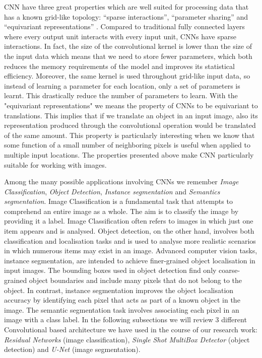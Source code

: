 CNN have three great properties which are well suited for processing data that has a known grid-like topology: “sparse interactions”, “parameter sharing” and “equivariant representations” \citep{goodfellow2016deep}. Compared to traditional fully connected layers where every output unit interacts with every input unit, CNNs have sparse interactions. In fact, the size of the convolutional kernel is lower than the size of the input data which means that we need to store fewer parameters, which both reduces the memory requirements of the model and improves its statistical efficiency. Moreover, the same kernel is used throughout grid-like input data, so instead of learning a parameter for each location, only a set of parameters is
learnt. This drastically reduce the number of parameters to learn. With the "equivariant representations" we means the property of CNNs to be equivariant to translations. This implies that if we translate an object in an input image, also its representation produced through the convolutional operation would be translated of the same amount. This property is particularly interesting when we know that some function of a small number of neighboring pixels is useful when applied to multiple input locations. The properties presented above make CNN particularly suitable for working with images. 

Among the many possible applications involving CNNs we remember \textit{Image Classification}, \textit{Object Detection}, \textit{Instance segmentation} and \textit{Semantics segmentation}. Image Classification is a fundamental task that attempts to comprehend an entire image as a whole. The aim is to classify the image by providing it a label. Image Classification often refers to images in which just one item appears and is analysed. Object detection, on the other hand, involves both classification and localisation tasks and is used to analyse more realistic scenarios in which numerous items may exist in an image. Advanced computer vision tasks, instance segmentation, are intended to achieve finer-grained object localisation in input images. The bounding boxes used in object detection find only coarse-grained object boundaries and include many pixels that do not belong to the object. In contrast, instance segmentation improves the object localisation accuracy by identifying each pixel that acts as part of a known object in the image. The semantic segmentation task involves associating each pixel in an image with a class label. In the following subsections we will review 3 different Convolutional based architecture we have used in the course of our research work: \textit{Residual Networks} (image classification), \textit{Single Shot MultiBox Detector} (object detection) and \textit{U-Net} (image segmentation).

